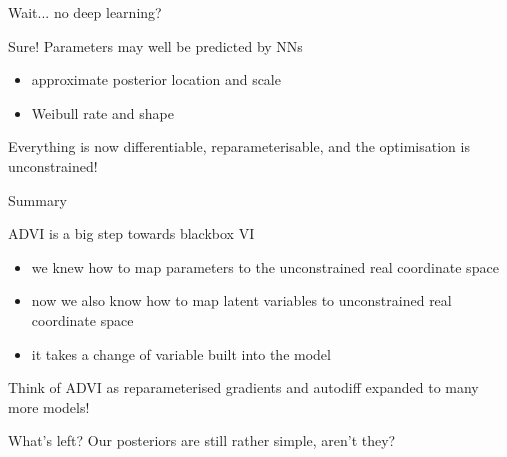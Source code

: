 \begin{frame}{Wait... no deep learning?}

	Sure! Parameters may well be predicted by NNs
	
	\begin{itemize}
		\item approximate posterior location and scale
		\item Weibull rate and shape
	\end{itemize}
	
	Everything is now differentiable, reparameterisable, and the optimisation is unconstrained!
	
\end{frame}


\begin{frame}{Summary}

ADVI is a big step towards blackbox VI \pause
\begin{itemize}
	\item we knew how to map parameters to the unconstrained real coordinate space \pause
	\item now we also know how to map latent variables to unconstrained real coordinate space \pause
	\item it takes a change of variable built into the model \pause
\end{itemize}

Think of ADVI as reparameterised gradients and autodiff expanded to many more models! \pause

\alert{What's left?} \pause Our posteriors are still rather simple, aren't they?

\end{frame}


\begin{frame}[allowframebreaks]


\end{frame}
